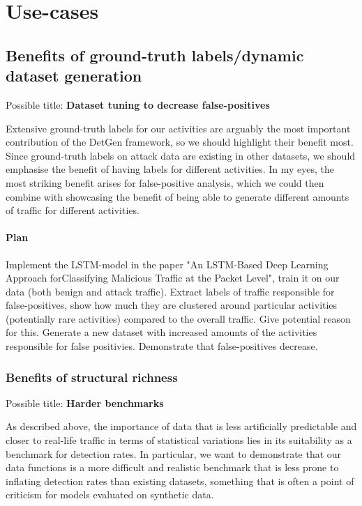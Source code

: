 \documentclass{article}
\begin{document}
\section{Use-cases}


\subsection{Benefits of ground-truth labels/dynamic dataset generation}
Possible title: \textbf{Dataset tuning to decrease false-positives}

Extensive ground-truth labels for our activities are arguably the most important contribution of the DetGen framework, so we should highlight their benefit most. Since ground-truth labels on attack data are existing in other datasets, we should emphasise the benefit of having labels for different activities. In my eyes, the most striking benefit arises for false-positive analysis, which we could then combine with showcasing the benefit of being able to generate different amounts of traffic for different activities.


\paragraph{Plan}
Implement the LSTM-model in the paper "An LSTM-Based Deep Learning Approach forClassifying Malicious Traffic at the Packet Level", train it on our data (both benign and attack traffic). Extract labels of traffic responsible for false-positives, show how much they are clustered around particular activities (potentially rare activities) compared to the overall traffic. Give potential reason for this. Generate a new dataset with increased amounts of the activities responsible for false positivies. Demonstrate that false-positives decrease.

\subsubsection{Benefits of structural richness}

Possible title: \textbf{Harder benchmarks}

As described above, the importance of data that is less artificially predictable and closer to real-life traffic in terms of statistical variations lies in its suitability as a benchmark for detection rates. In particular, we want to demonstrate that our data functions is a more difficult and realistic benchmark that is less prone to inflating detection rates than existing datasets, something that is often a point of criticism for models evaluated on synthetic data. 
\end{document}
